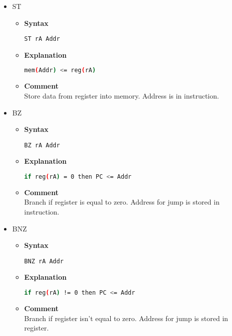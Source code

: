 \begin{itemize}
    \item ST
    \begin{itemize}
        \item \textbf{Syntax}
        \begin{lstlisting}[language={[x86masm]Assembler}, frame=single]
    ST rA Addr
        \end{lstlisting}
        \item \textbf{Explanation}
        \begin{lstlisting}[language=bash, frame=single]
    mem(Addr) <= reg(rA)
        \end{lstlisting}
        \item \textbf{Comment} \\
    Store data from register into memory. Address is in instruction.
    \end{itemize}

    \item BZ
    \begin{itemize}
        \item \textbf{Syntax}
        \begin{lstlisting}[language={[x86masm]Assembler}, frame=single]
    BZ rA Addr
        \end{lstlisting}
        \item \textbf{Explanation}
        \begin{lstlisting}[language=bash, frame=single]
    if reg(rA) = 0 then PC <= Addr
        \end{lstlisting}
        \item \textbf{Comment} \\
    Branch if register is equal to zero. Address for jump is stored in instruction.
    \end{itemize}

    \item BNZ
    \begin{itemize}
        \item \textbf{Syntax}
        \begin{lstlisting}[language={[x86masm]Assembler}, frame=single]
    BNZ rA Addr
        \end{lstlisting}
        \item \textbf{Explanation}
        \begin{lstlisting}[language=bash, frame=single]
    if reg(rA) != 0 then PC <= Addr
        \end{lstlisting}
        \item \textbf{Comment} \\
    Branch if register isn't equal to zero. Address for jump is stored in register.
    \end{itemize}


\end{itemize}
